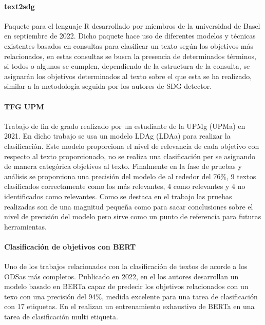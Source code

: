 \paragraph{text2sdg}Paquete para el lenguaje R desarrollado por miembros de la
universidad de Basel en septiembre de 2022. Dicho paquete hace uso de diferentes
modelos y técnicas existentes basados en consultas para clasificar un texto
según los objetivos más relacionados, en estas consultas se busca la presencia
de determinados términos, si todos o algunos se cumplen, dependiendo de la
estructura de la consulta, se asignarán los objetivos determinados al texto
sobre el que esta se ha realizado, similar a la metodología seguida por los
autores de SDG detector. \cite{text2sdg1, text2sdg2, text2sdgWeb}

\paragraph{TFG UPM}Trabajo de fin de grado realizado por un estudiante de la
\gls{UPMg} (\gls{UPMa}) en 2021. En dicho trabajo se usa un
modelo \gls{LDAg} (\gls{LDAa}) para realizar la clasificación. Este modelo
proporciona el nivel de relevancia de cada objetivo con respecto al texto
proporcionado, no se realiza una clasificación per se asignando de manera
categórica objetivos al texto. Finalmente en la fase de pruebas y análisis se
proporciona una precisión del modelo de al rededor del 76\%, 9 textos
clasificados correctamente como los más relevantes, 4 como relevantes y 4 no
identificados como relevantes. Como se destaca en el trabajo las pruebas
realizadas son de una magnitud pequeña como para sacar conclusiones sobre el
nivel de precisión del modelo pero sirve como un punto de referencia para
futuras herramientas. \cite{upm68099}

\paragraph{Clasificación de objetivos con BERT}Uno de los trabajos relacionados con la
clasificación de textos de acorde a los \gls{ODSa}s más completos. Publicado en 2022,
en el los autores desarrollan un modelo basado en \gls{BERTa} capaz de predecir los
objetivos relacionados con un texo con una precisión del 94\%, medida excelente
para una tarea de clasificación con 17 etiquetas. En el realizan un
entrenamiento exhaustivo de \gls{BERTa} en una tarea de clasificación multi etiqueta.
\cite{matsui2022natural}

